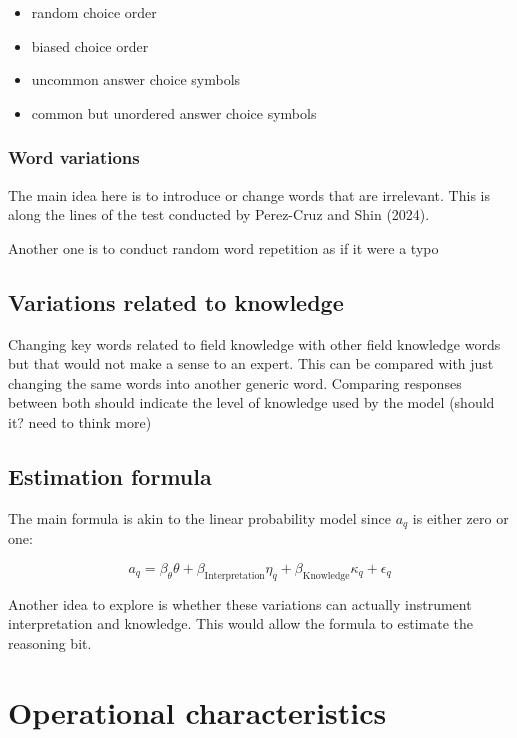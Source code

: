 \documentclass[
]{article}
\begin{document}
\begin{itemize}
\item
  random choice order
\item
  biased choice order
\item
  uncommon answer choice symbols
\item
  common but unordered answer choice symbols
\end{itemize}

\hypertarget{word-variations}{%
\subsubsection{Word variations}\label{word-variations}}

The main idea here is to introduce or change words that are irrelevant.
This is along the lines of the test conducted by Perez-Cruz and Shin
(2024).

Another one is to conduct random word repetition as if it were a typo

\hypertarget{variations-related-to-knowledge}{%
\subsection{Variations related to
knowledge}\label{variations-related-to-knowledge}}

Changing key words related to field knowledge with other field knowledge
words but that would not make a sense to an expert. This can be compared
with just changing the same words into another generic word. Comparing
responses between both should indicate the level of knowledge used by
the model (should it? need to think more)

\hypertarget{estimation-formula}{%
\subsection{Estimation formula}\label{estimation-formula}}

The main formula is akin to the linear probability model since \(a_{q}\)
is either zero or one:

\[
a_{q} = \beta_{\theta} \theta + \beta_{\text{Interpretation}} \eta_q + \beta_{\text{Knowledge}} \kappa_q + \epsilon_q
\]

Another idea to explore is whether these variations can actually
instrument interpretation and knowledge. This would allow the formula to
estimate the reasoning bit.

\hypertarget{operational-characteristics}{%
\section{Operational
characteristics}\label{operational-characteristics}}
\end{document}
